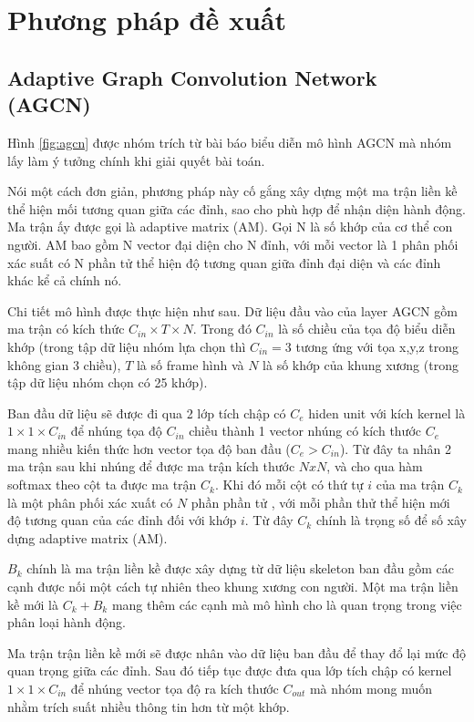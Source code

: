 \section{Phương pháp đề xuất}

\subsection{Adaptive Graph Convolution Network (AGCN)}
Hình \ref{fig:agcn} được nhóm trích từ bài báo \cite{shi2020skeleton} biểu diễn mô hình AGCN mà nhóm lấy làm ý tưởng chính khi giải quyết bài toán.

Nói một cách đơn giản, phương pháp này cố gắng xây dựng một ma trận liền kề thể hiện mối tương quan giữa các đỉnh, sao cho phù hợp để nhận diện hành động. Ma trận ấy được gọi là adaptive matrix (AM). Gọi N là số khớp của cơ thể con người. AM bao gồm N vector đại diện cho N đỉnh, với mỗi vector là 1 phân phối xác suất có N phần tử thể hiện độ tương quan giữa đỉnh đại diện và các đỉnh khác kể cả chính nó.

Chi tiết mô hình được thực hiện như sau. Dữ liệu đầu vào của layer AGCN gồm ma trận có kích thức $C_{in} \times T \times N$. Trong đó $C_{in}$ là số chiều của tọa độ biểu diễn khớp (trong tập dữ liệu nhóm lựa chọn thì $C_{in} = 3$ tương ứng với tọa x,y,z trong không gian 3 chiều), $T$ là số frame hình và $N$ là số khớp của khung xương (trong tập dữ liệu nhóm chọn có 25 khớp).

Ban đầu dữ liệu sẽ được đi qua 2 lớp tích chập có $C_e$ hiden unit với kích kernel là $1 \times 1 \times C_{in}$ để nhúng tọa độ $C_{in}$ chiều thành 1 vector nhúng có kích thước $C_e$ mang nhiều kiến thức hơn vector tọa độ ban đầu ($C_e > C_{in}$). Từ đây ta nhân 2 ma trận sau khi nhúng để được ma trận kích thước $NxN$, và cho qua hàm softmax theo cột ta được ma trận $C_k$. Khi đó mỗi cột có thứ tự $i$ của ma trận $C_k$ là một phân phối xác xuất có $N$ phần phần tử , với mỗi phần thử thể hiện mới độ tương quan của các đỉnh đối với khớp $i$. Từ đây $C_k$ chính là trọng số để số xây dựng adaptive matrix (AM).

$B_k$ chính là ma trận liền kề được xây dựng từ dữ liệu skeleton ban đầu gồm các cạnh được nối một cách tự nhiên theo khung xương con người. Một ma trận liền kề mới là $C_k + B_k$ mang thêm các cạnh mà mô hình cho là quan trọng trong việc phân loại hành động.

Ma trận trận liền kề mới sẽ được nhân vào dữ liệu ban đầu để thay đổ lại mức độ quan trọng giữa các đỉnh. Sau đó tiếp tục được đưa qua lớp tích chập có kernel $1 \times 1 \times C_{in}$ để nhúng vector tọa độ ra kích thước $C_{out}$ mà nhóm mong muốn nhằm trích suất nhiều thông tin hơn từ một khớp.

